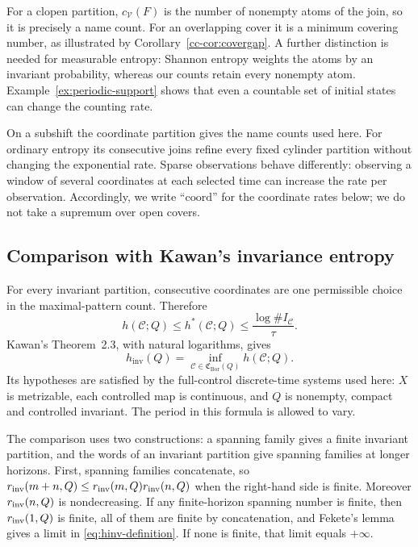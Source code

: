 \documentclass[11pt,reqno]{amsart}
\numberwithin{equation}{section}
\theoremstyle{definition}
\theoremstyle{definition}
\newcommand{\C}{\mathcal C}
\newcommand{\hpat}{h^{*}}
\newcommand{\hinv}{h_{\mathrm{inv}}}
\newcommand{\Bor}{\mathrm{Bor}}
\begin{document}
For a clopen partition, $c_{\mathcal V}(F)$ is the number of
nonempty atoms of the join, so it is precisely a name count. For an
overlapping cover it is a minimum covering number, as illustrated
by Corollary~\ref{cc-cor:covergap}. A further distinction is needed
for measurable entropy: Shannon entropy weights the atoms by an
invariant probability, whereas our counts retain every nonempty
atom. Example~\ref{ex:periodic-support} shows that even a countable
set of initial states can change the counting rate.

On a subshift the coordinate partition gives the name counts used
here. For ordinary entropy its consecutive joins refine every fixed
cylinder partition without changing the exponential rate. Sparse
observations behave differently: observing a window of several
coordinates at each selected time can increase the rate per
observation. Accordingly, we write ``$\mathrm{coord}$'' for the
coordinate rates below; we do not take a supremum over open covers.

\subsection{Comparison with Kawan's invariance entropy}
For every invariant partition, consecutive coordinates are one permissible
choice in the maximal-pattern count. Therefore
\begin{equation}\label{eq:ordinary-pattern-one-sided}
 h(\C;Q)\le\hpat(\C;Q)\le\frac{\log\#I_\C}{\tau}.
\end{equation}
Kawan's Theorem~2.3, with natural logarithms, gives
\begin{equation}\label{eq:kawan-characterization}
 \hinv(Q)=\inf_{\C\in\mathfrak C_{\Bor}(Q)}h(\C;Q).
\end{equation}
Its hypotheses are satisfied by the full-control discrete-time systems
used here: $X$ is metrizable, each controlled map is continuous, and
$Q$ is nonempty, compact and controlled invariant.
The period in this formula is allowed to vary.

The comparison uses two constructions: a spanning family gives a
finite invariant partition, and the words of an invariant partition
give spanning families at longer horizons. First, spanning families
concatenate, so
$r_{\rm inv}(m+n,Q)\le r_{\rm inv}(m,Q)r_{\rm inv}(n,Q)$ when the
right-hand side is finite. Moreover $r_{\rm inv}(n,Q)$ is nondecreasing.
If any finite-horizon spanning number is finite, then $r_{\rm inv}(1,Q)$
is finite, all of them are finite by concatenation, and Fekete's lemma
gives a limit in \eqref{eq:hinv-definition}. If none is finite, that
limit equals $+\infty$.
\end{document}
